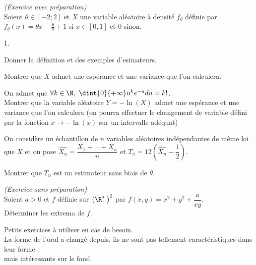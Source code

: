 \documentclass[11pt]{article}%
\begin{document}


\begin{exercice}{\it (Exercice avec préparation)}~\\
  Soient $\theta \in \left[ -2;2\right] $ et $X$ une variable
  aléatoire à densité $f_{\theta }$ définie par $f_{\theta }\left(
    x\right) =\theta x-\frac{\theta }{2}+1$ si $x\in \left[
    0,1\right]$ et $0$ sinon.

  \begin{noliste}{1.}
  \item Donner la définition et des exemples d'esimateurs.

  \item Montrer que $X$ admet une espérance et une variance que l'on
    calculera.

  \item On admet que $\forall k\in \N,\mathbb{\ }\dint{0}{+\infty
    }u^{k}e^{-u}du=k!$.\\
    Montrer que la variable aléatoire $Y=-\ln \left( X\right) $ admet
    une espérance et une variance que l'on calculera (on pourra
    effectuer le changement de variable défini par la fonction
    $x\rightarrow -\ln \left( x\right) $ sur un intervalle adéquat)

    On considère un échantillon de $n$ variables aléatoires
    indépendantes de même loi que $X$ et on pose $\widehat{X_{n}} =
    \dfrac{X_{1}+\cdots +X_{n}}{n}$ et $T_{n} = 12\left(
      \widehat{X_{n}}-\dfrac{1}{2}\right) $.

  \item Montrer que $T_{n}$ est un estimateur sans biais de $\theta $.
  \end{noliste}
\end{exercice}

\addtocounter{exercice}{-1}
\begin{exercice}{\it (Exercice sans préparation)}~\\
  Soient $a>0$ et $f$ définie sur $\left( \R_{+}^{\ast }\right) ^{2}$
  par $f\left( x,y\right) =x^{2}+y^{2}+\dfrac{a}{xy}$.\\
  Déterminer les extrema de $f$.
\end{exercice}




\begin{center} 
  Petits exercices à utiliser en cas de besoin. \\
  La forme de l'oral a changé depuis, ils ne sont pas tellement
  caractéristiques dans leur forme \\
  mais intéressants sur le fond. 
\end{center}
\end{document}

